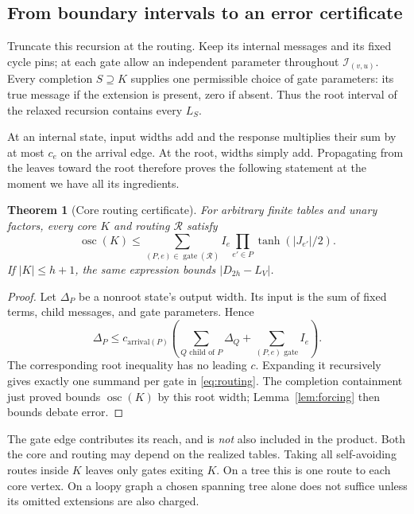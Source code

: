 \documentclass[11pt]{article}
\newtheorem{theorem}{Theorem}[section]
\theoremstyle{definition}
\theoremstyle{remark}
\DeclareMathOperator{\osc}{osc}
\newcommand{\reach}{\mathcal I}
\newcommand{\routing}{\mathcal R}
\newcommand{\err}{|D_{2h}-L_V|}
\begin{document}
\subsection{From boundary intervals to an error certificate}
Truncate this recursion at the routing. Keep its internal messages and its
fixed cycle pins; at each gate allow an independent parameter throughout
$\reach_{(v,u)}$. Every completion $S\supseteq K$ supplies one permissible
choice of gate parameters: its true message if the extension is present,
zero if absent. Thus the root interval of the relaxed recursion contains
every $L_S$.

At an internal state, input widths add and the response multiplies their
sum by at most $c_e$ on the arrival edge. At the root, widths simply add.
Propagating from the leaves toward the root therefore proves the following
statement at the moment we have all its ingredients.

\begin{theorem}[Core routing certificate]
\label{thm:core}
For arbitrary finite tables and unary factors, every core $K$ and routing
$\routing$ satisfy
\begin{equation}
 \osc(K)\le\sum_{(P,e)\in\operatorname{gate}(\routing)}
                       I_e\prod_{e'\in P}\tanh(|J_{e'}|/2).
 \label{eq:routing}
\end{equation}
If $|K|\le h+1$, the same expression bounds $\err$.
\end{theorem}
\begin{proof}
Let $\Delta_P$ be a nonroot state's output width. Its input is the sum of
fixed terms, child messages, and gate parameters. Hence
\[
 \Delta_P\le c_{\mathrm{arrival}(P)}
 \left(\sum_{Q\text{ child of }P}\Delta_Q+
              \sum_{(P,e)\text{ gate}}I_e\right).
\]
The corresponding root inequality has no leading $c$. Expanding it
recursively gives exactly one summand per gate in \eqref{eq:routing}.
The completion containment just proved bounds $\osc(K)$ by this root width;
Lemma~\ref{lem:forcing} then bounds debate error.
\end{proof}

The gate edge contributes its reach, and is \emph{not} also included in the
product. Both the core and routing may depend on the realized tables.
Taking all self-avoiding routes inside $K$ leaves only gates exiting $K$.
On a tree this is one route to each core vertex. On a loopy graph a chosen
spanning tree alone does not suffice unless its omitted extensions are
also charged.
\end{document}
